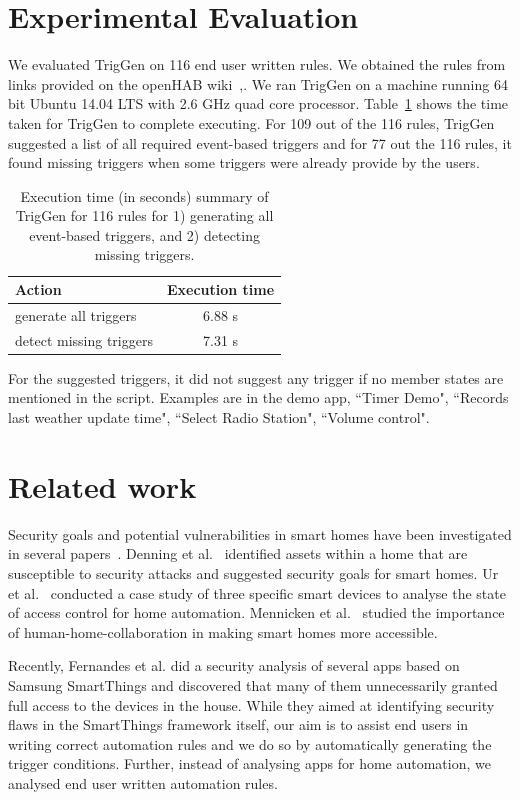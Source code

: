 \documentclass{sig-alternate-05-2015}
\begin{document}
 
\section{Experimental Evaluation}
We evaluated TrigGen on 116 end user written rules. We obtained the rules from links provided on the openHAB wiki~\cite{data1},\cite{data2}. We ran TrigGen on a machine running 64 bit Ubuntu 14.04 LTS with 2.6 GHz quad core processor. Table~\ref{tab:time} shows the time taken for TrigGen to complete executing.
For 109 out of the 116 rules, TrigGen suggested a list of all required event-based triggers and for 77 out the 116 rules, it found missing triggers when some triggers were already provide by the users. 

\begin{table}[ht]
\centering
\begin{tabular}{|l|c|}
\hline
Action & Execution time\\ \hline
generate all triggers & 6.88 s \\ \hline
detect missing triggers & 7.31 s \\\hline
\end{tabular}
\caption{Execution time  (in seconds) summary of TrigGen for 116 rules for 1) generating all event-based triggers, and 2) detecting missing triggers. }
\label{tab:time}
\end{table}

For the suggested triggers, it did not suggest any trigger if no member states are mentioned in the script. Examples are in the demo app, ``Timer Demo", ``Records last weather update time", ``Select Radio Station", ``Volume control".


\section{Related work}
Security goals and potential vulnerabilities in smart homes have been investigated in several papers~\cite{yoshi, dhanjani, jung, todayToTomorrow}. Denning et al.~\cite{yoshi} identified assets within a home that are susceptible to security attacks and suggested security goals for smart homes. Ur et al.~\cite{jung} conducted a case study of three specific smart devices to analyse the state of access control for home automation. Mennicken et al.~\cite{todayToTomorrow} studied the importance of human-home-collaboration in making smart homes more accessible.

Recently, Fernandes et al.\cite{smartthings16} did a security analysis of several apps based on Samsung SmartThings and discovered that many of them unnecessarily granted full access to the devices in the house. While they aimed at identifying security flaws in the SmartThings framework itself, our aim is to assist end users in writing correct automation rules and we do so by automatically generating the trigger conditions.  Further, instead of analysing apps for home automation, we analysed end user written automation rules.
\end{document}
